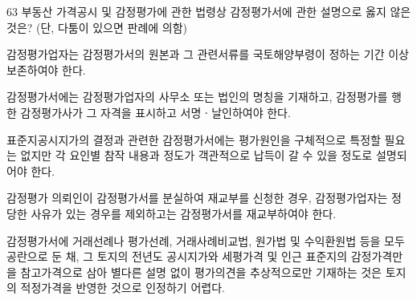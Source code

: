 \begin{question}{63}
부동산 가격공시 및 감정평가에 관한 법령상 감정평가서에 관한 설명으로 옳지 않은 것은? (단, 다툼이 있으면 판례에 의함)
\begin{choices}
  \item 감정평가업자는 감정평가서의 원본과 그 관련서류를 국토해양부령이 정하는 기간 이상 보존하여야 한다.
  \item 감정평가서에는 감정평가업자의 사무소 또는 법인의 명칭을 기재하고, 감정평가를 행한 감정평가사가 그 자격을 표시하고 서명ㆍ날인하여야 한다.
  \item 표준지공시지가의 결정과 관련한 감정평가서에는 평가원인을 구체적으로 특정할 필요는 없지만 각 요인별 참작 내용과 정도가 객관적으로 납득이 갈 수 있을 정도로 설명되어야 한다.
  \item 감정평가 의뢰인이 감정평가서를 분실하여 재교부를 신청한 경우, 감정평가업자는 정당한 사유가 있는 경우를 제외하고는 감정평가서를 재교부하여야 한다.
  \item 감정평가서에 거래선례나 평가선례, 거래사례비교법, 원가법 및 수익환원법 등을 모두 공란으로 둔 채, 그 토지의 전년도 공시지가와 세평가격 및 인근 표준지의 감정가격만을 참고가격으로 삼아 별다른 설명 없이 평가의견을 추상적으로만 기재하는 것은 토지의 적정가격을 반영한 것으로 인정하기 어렵다.
\end{choices}
\end{question}
